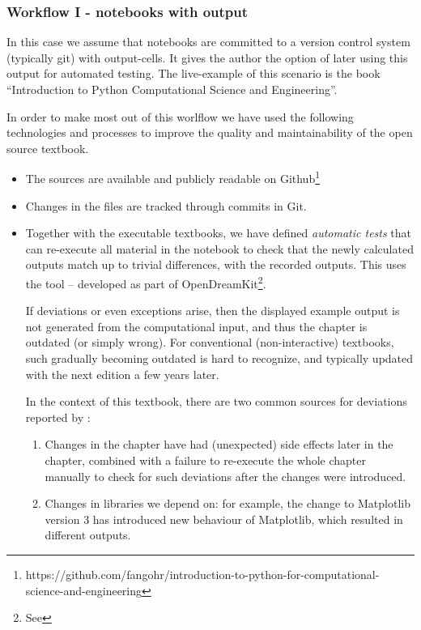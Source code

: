 \documentclass{deliverablereport}
\begin{document}
{{{\bigskip


\subsubsection{Workflow I - notebooks with output}

In this case we assume that notebooks are committed to a version
control system (typically git) with output-cells. It gives the author
the option of later using this output for automated testing. The
live-example of this scenario is the book ``Introduction to Python
Computational Science and Engineering''.

In order to make most out of this worlflow we have used the following
technologies and processes to improve the quality and maintainability
of the open source textbook.
\begin{itemize}
\item The sources are available and publicly readable on
  Github\footnote{https://github.com/fangohr/introduction-to-python-for-computational-science-and-engineering}
\item Changes in the files are tracked through commits in Git.
\item Together with the executable textbooks, we have defined
  \emph{automatic tests} that can re-execute all material in the
  notebook to check that the newly calculated outputs match
  up to trivial differences, with the recorded outputs.
  This uses the \nbval tool -- developed as part of
  OpenDreamKit\footnote{ See  }.

  If deviations or even exceptions arise, then the displayed example
  output is not generated from the computational input, and thus the
  chapter is outdated (or simply wrong). For conventional
  (non-interactive) textbooks, such gradually becoming outdated is
  hard to recognize, and typically updated with the next edition a
  few years later.

  In the context of this textbook, there are two common sources for
  deviations reported by \nbval:
  \begin{enumerate}
  \item Changes in the chapter have had (unexpected) side effects
    later in the chapter, combined with a failure to re-execute the
    whole chapter manually to check for such deviations after the
    changes were introduced.
  \item Changes in libraries we depend on: for example, the change to
    Matplotlib version 3 has introduced new behaviour of Matplotlib,
    which resulted in different outputs.
  \end{enumerate}


\end{itemize}}}}
\end{document}
